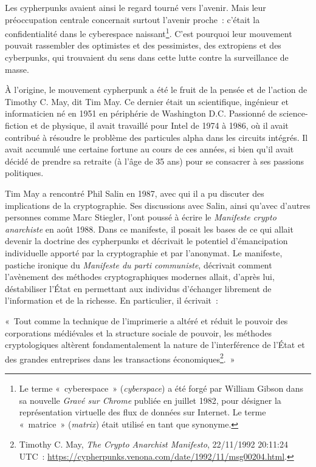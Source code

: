 \documentclass[
  a5paper,
  smalldemyvopaper,10pt,twoside,onecolumn,openright,extrafontsizes,hidelinks]{memoir}
\begin{document}
Les cypherpunks avaient ainsi le regard tourné vers l'avenir. Mais leur
préoccupation centrale concernait surtout l'avenir proche~: c'était la
confidentialité dans le cyberespace naissant\footnote{Le terme
  «~cyberespace~» (\emph{cyberspace}) a été forgé par William Gibson
  dans sa nouvelle \emph{Gravé sur Chrome} publiée en juillet 1982, pour
  désigner la représentation virtuelle des flux de données sur Internet.
  Le terme «~matrice~» (\emph{matrix}) était utilisé en tant que
  synonyme.}. C'est pourquoi leur mouvement pouvait rassembler des
optimistes et des pessimistes, des extropiens et des cyberpunks, qui
trouvaient du sens dans cette lutte contre la surveillance de masse.

À l'origine, le mouvement cypherpunk a été le fruit de la pensée et de
l'action de Timothy C. May, dit Tim May. Ce dernier était un
scientifique, ingénieur et informaticien né en 1951 en périphérie de
Washington D.C. Passionné de science-fiction et de physique, il avait
travaillé pour Intel de 1974 à 1986, où il avait contribué à résoudre le
problème des particules alpha dans les circuits intégrés. Il avait
accumulé une certaine fortune au cours de ces années, si bien qu'il
avait décidé de prendre sa retraite (à l'âge de 35 ans) pour se
consacrer à ses passions politiques.

Tim May a rencontré Phil Salin en 1987, avec qui il a pu discuter des
implications de la cryptographie. Ses discussions avec Salin, ainsi
qu'avec d'autres personnes comme Marc Stiegler, l'ont poussé à écrire le
\emph{Manifeste crypto anarchiste} en août 1988. Dans ce manifeste, il
posait les bases de ce qui allait devenir la doctrine des cypherpunks et
décrivait le potentiel d'émancipation individuelle apporté par la
cryptographie et par l'anonymat. Le manifeste, pastiche ironique du
\emph{Manifeste du parti communiste}, décrivait comment l'avènement des
méthodes cryptographiques modernes allait, d'après lui, déstabiliser
l'État en permettant aux individus d'échanger librement de l'information
et de la richesse. En particulier, il écrivait~:

«~Tout comme la technique de l'imprimerie a altéré et réduit le pouvoir
des corporations médiévales et la structure sociale de pouvoir, les
méthodes cryptologiques altèrent fondamentalement la nature de
l'interférence de l'État et des grandes entreprises dans les
transactions économiques\footnote{Timothy C. May, \emph{The Crypto
  Anarchist Manifesto}, 22/11/1992 20:11:24 UTC~:
  \url{https://cypherpunks.venona.com/date/1992/11/msg00204.html}.}.~»
\end{document}
